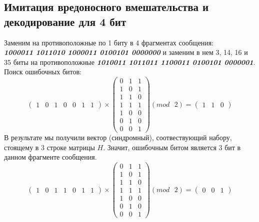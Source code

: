 \documentclass[a5paper, 10pt]{article}
\theoremstyle{definition}
\theoremstyle{plain}
\theoremstyle{remark}
\begin{document}
\subsection{Имитация вредоносного вмешательства и декодирование для 4 бит}
Заменим на противоположные по 1 биту в 4 фрагментах сообщения:\\
 \textbf{\textit{10\colorbox[rgb]{0.50, 0.5, 0.5}{0}0011 101101\colorbox[rgb]{0.50, 0.5, 0.5}{0} 1\colorbox[rgb]{0.50, 0.5, 0.5}{0}00011 0100101 000000\colorbox[rgb]{0.50, 0.5, 0.5}{0}}} и заменим в нем 3, 14, 16 и 35 биты на противоположные  \textbf{\textit{10\colorbox[rgb]{0.4, 0.8, 0.8}{1}0011 101101\colorbox[rgb]{0.4, 0.8, 0.8}{1} 1\colorbox[rgb]{0.4, 0.8, 0.8}{1}00011 0100101 000000\colorbox[rgb]{0.4, 0.8, 0.8}{1}}}.\\
Поиск ошибочных битов:
\begin{equation}
\begin{pmatrix}
1 & 0 & 1 & 0 & 0 & 1 & 1
\end{pmatrix}
 \times
\begin{pmatrix}
0 & 1 & 1\\
1 & 0 & 1\\
1 & 1 & 0\\
1 & 1 & 1 \\
1 & 0 & 0\\
0 & 1 & 0 \\
0 & 0 & 1
\end{pmatrix}
(mod \text{ }2)
= \begin{pmatrix}
1 & 1 & 0 
\end{pmatrix}
\end{equation}
В результате мы получили вектор (синдромный), соотвествующий набору, стоящему в 3 строке матрицы $H$. Значит, ошибочным битом является 3 бит в данном фрагменте сообщения.\\
\begin{equation}
\begin{pmatrix}
1 & 0 & 1 & 1 & 0 & 1 & 1
\end{pmatrix}
 \times
\begin{pmatrix}
0 & 1 & 1\\
1 & 0 & 1\\
1 & 1 & 0\\
1 & 1 & 1 \\
1 & 0 & 0\\
0 & 1 & 0 \\
0 & 0 & 1
\end{pmatrix}
(mod \text{ }2)
= \begin{pmatrix}
0 & 0 & 1 
\end{pmatrix}
\end{equation}
\end{document}

